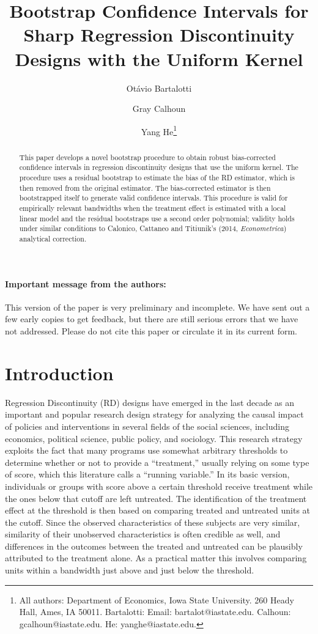 \documentclass[12pt,fleqn]{article}
\title{Bootstrap Confidence Intervals for Sharp Regression Discontinuity Designs
  with the Uniform Kernel}
\author{Ot\'avio Bartalotti \and Gray Calhoun \and Yang He\thanks{All authors:
Department of Economics, Iowa State University. 260 Heady Hall, Ames, IA  50011.
Bartalotti: Email: bartalot@iastate.edu. Calhoun: gcalhoun@iastate.edu.
He: yanghe@iastate.edu.}}
\begin{document}
\maketitle

\begin{abstract}\noindent
  This paper develops a novel bootstrap procedure to obtain robust
  bias-corrected confidence intervals in regression discontinuity designs that
  use the uniform kernel. The procedure uses a residual bootstrap to estimate
  the bias of the RD estimator, which is then removed from the original
  estimator.  The bias-corrected estimator is then bootstrapped itself to
  generate valid confidence intervals. This procedure is valid for empirically
  relevant bandwidths when the treatment effect is estimated with a local linear
  model and the residual bootstraps use a second order polynomial; validity
  holds under similar conditions to Calonico, Cattaneo and Titiunik's (2014,
  \textit{Econometrica}) analytical correction.
\end{abstract}

\paragraph{Important message from the authors:} This version of the paper is
very preliminary and incomplete. We have sent out a few early copies to get
feedback, but there are still serious errors that we have not addressed. Please
do not cite this paper or circulate it in its current form.

\newpage
\section{Introduction}
Regression Discontinuity (RD) designs have emerged in the last decade as an
important and popular research design strategy for analyzing the causal impact
of policies and interventions in several fields of the social sciences,
including economics, political science, public policy, and sociology.
This research strategy exploits the fact that many programs use somewhat
arbitrary thresholds to determine whether or not to provide a ``treatment,''
usually relying on some type of score, which this literature calls a ``running
variable.'' In its basic version, individuals or groups with score above a
certain threshold receive treatment while the ones below that cutoff are left
untreated.
The identification of the treatment effect at the threshold is then based on
comparing treated and untreated units at the cutoff. Since the observed
characteristics of these subjects are very similar, similarity of their
unobserved characteristics is often credible as well, and differences in the
outcomes between the treated and untreated can be plausibly attributed to the
treatment alone. As a practical matter this involves comparing units within a
bandwidth just above and just below the threshold.
\end{document}
